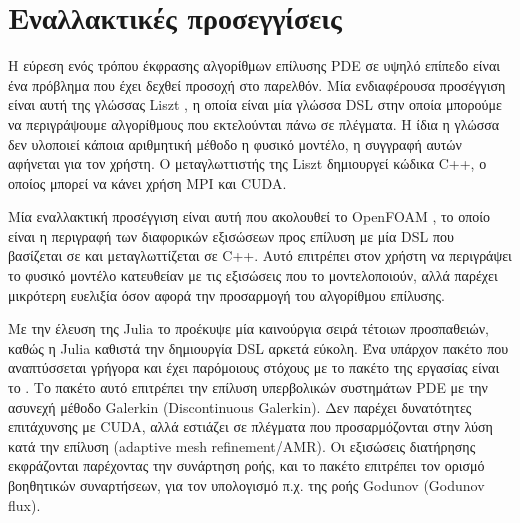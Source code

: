 \section{Εναλλακτικές προσεγγίσεις}

Η εύρεση ενός τρόπου έκφρασης αλγορίθμων επίλυσης PDE σε υψηλό επίπεδο είναι ένα πρόβλημα που έχει δεχθεί προσοχή στο παρελθόν.
Μία ενδιαφέρουσα προσέγγιση είναι αυτή της γλώσσας Liszt \cite{Liszt2011}, η οποία είναι μία γλώσσα DSL στην οποία μπορούμε να περιγράψουμε αλγορίθμους που εκτελούνται πάνω σε πλέγματα.
Η ίδια η γλώσσα δεν υλοποιεί κάποια αριθμητική μέθοδο η φυσικό μοντέλο, η συγγραφή αυτών αφήνεται για τον χρήστη.
Ο μεταγλωττιστής της Liszt δημιουργεί κώδικα C++, ο οποίος μπορεί να κάνει χρήση MPI και CUDA.

Μία εναλλακτική προσέγγιση είναι αυτή που ακολουθεί το OpenFOAM \cite{Weller1998}, το οποίο είναι η περιγραφή των διαφορικών εξισώσεων προς επίλυση με μία DSL που βασίζεται σε και μεταγλωττίζεται σε C++.
Αυτό επιτρέπει στον χρήστη να περιγράψει το φυσικό μοντέλο κατευθείαν με τις εξισώσεις που το μοντελοποιούν, αλλά παρέχει μικρότερη ευελιξία όσον αφορά την προσαρμογή του αλγορίθμου επίλυσης.

Με την έλευση της Julia το προέκυψε μία καινούργια σειρά τέτοιων προσπαθειών, καθώς η Julia καθιστά την δημιουργία DSL αρκετά εύκολη.
Ένα υπάρχον πακέτο που αναπτύσσεται γρήγορα και έχει παρόμοιους στόχους με το πακέτο της εργασίας είναι το  \cite{Trixi2020}.
Το πακέτο αυτό επιτρέπει την επίλυση υπερβολικών συστημάτων PDE με την ασυνεχή μέθοδο Galerkin (Discontinuous Galerkin).
Δεν παρέχει δυνατότητες επιτάχυνσης με CUDA, αλλά εστιάζει σε πλέγματα που προσαρμόζονται στην λύση κατά την επίλυση (adaptive mesh refinement/AMR).
Οι εξισώσεις διατήρησης εκφράζονται παρέχοντας την συνάρτηση ροής, και το πακέτο επιτρέπει τον ορισμό βοηθητικών συναρτήσεων, για τον υπολογισμό π.χ. της ροής Godunov (Godunov flux).


